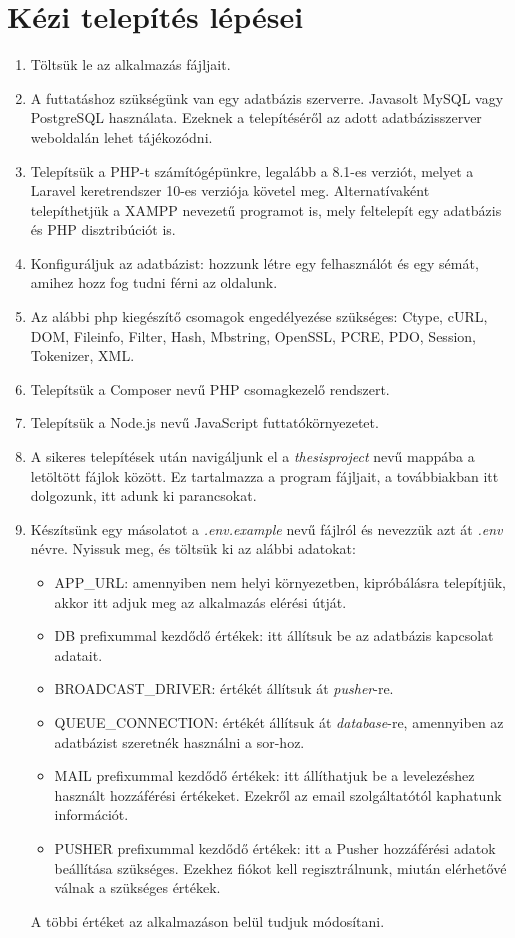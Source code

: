 \documentclass[
]{thesis-ekf}
\theoremstyle{definition}
\theoremstyle{remark}
\begin{document}
\section{Kézi telepítés lépései}
\begin{enumerate}
	\item Töltsük le az alkalmazás fájljait.
	\item A futtatáshoz szükségünk van egy adatbázis szerverre. Javasolt MySQL vagy PostgreSQL használata. Ezeknek a telepítéséről az adott adatbázisszerver weboldalán lehet tájékozódni.
	\item Telepítsük a PHP-t számítógépünkre, legalább a 8.1-es verziót, melyet a Laravel keretrendszer 10-es verziója követel meg. Alternatívaként telepíthetjük a XAMPP nevezetű programot is, mely feltelepít egy adatbázis és PHP disztribúciót is.
	\item Konfiguráljuk az adatbázist: hozzunk létre egy felhasználót és egy sémát, amihez hozz fog tudni férni az oldalunk.
	\item Az alábbi php kiegészítő csomagok engedélyezése szükséges: Ctype, cURL, DOM, Fileinfo, Filter, Hash, Mbstring, OpenSSL, PCRE, PDO, Session, Tokenizer, XML.
	\item Telepítsük a Composer nevű PHP csomagkezelő rendszert.
	\item Telepítsük a Node.js nevű JavaScript futtatókörnyezetet.
	\item A sikeres telepítések után navigáljunk el a \emph{thesisproject} nevű mappába a letöltött fájlok között. Ez tartalmazza a program fájljait, a továbbiakban itt dolgozunk, itt adunk ki parancsokat.
	\item Készítsünk egy másolatot a \emph{.env.example} nevű fájlról és nevezzük azt át \emph{.env} névre. Nyissuk meg, és töltsük ki az alábbi adatokat:
	\begin{itemize}
		\item APP\_URL: amennyiben nem helyi környezetben, kipróbálásra telepítjük, akkor itt adjuk meg az alkalmazás elérési útját.
		\item DB prefixummal kezdődő értékek: itt állítsuk be az adatbázis kapcsolat adatait.
		\item BROADCAST\_DRIVER: értékét állítsuk át \emph{pusher}-re.
		\item QUEUE\_CONNECTION: értékét állítsuk át \emph{database}-re, amennyiben az adatbázist szeretnék használni a sor-hoz.
		\item MAIL prefixummal kezdődő értékek: itt állíthatjuk be a levelezéshez használt hozzáférési értékeket. Ezekről az email szolgáltatótól kaphatunk információt.
		\item PUSHER prefixummal kezdődő értékek: itt a Pusher hozzáférési adatok beállítása szükséges. Ezekhez fiókot kell regisztrálnunk, miután elérhetővé válnak a szükséges értékek. 
	\end{itemize}
	A többi értéket az alkalmazáson belül tudjuk módosítani.


\end{enumerate}
\end{document}
